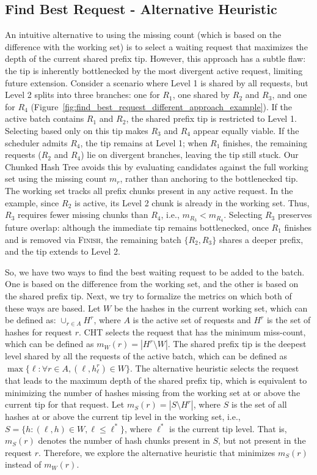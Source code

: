 \subsection{Find Best Request - Alternative Heuristic}
\label{subsec:find_best_reques_alternative_heuristic}
An intuitive alternative to using the missing count (which is based on the difference with the working set) is to select a waiting request that maximizes the depth of the current shared prefix tip. However, this approach has a subtle flaw: the tip is inherently bottlenecked by the most divergent active request, limiting future extension. Consider a scenario where Level 1 is shared by all requests, but Level 2 splits into three branches: one for $R_1$, one shared by $R_2$ and $R_3$, and one for $R_4$ (Figure~\ref{fig:find_best_request_different_approach_example}). If the active batch contains $R_1$ and $R_2$, the shared prefix tip is restricted to Level 1. Selecting based only on this tip makes $R_3$ and $R_4$ appear equally viable. If the scheduler admits $R_4$, the tip remains at Level 1; when $R_1$ finishes, the remaining requests ($R_2$ and $R_4$) lie on divergent branches, leaving the tip still stuck. Our Chunked Hash Tree avoids this by evaluating candidates against the full working set using the missing count $m_r$, rather than anchoring to the bottlenecked tip. The working set tracks all prefix chunks present in any active request. In the example, since $R_2$ is active, its Level 2 chunk is already in the working set. Thus, $R_3$ requires fewer missing chunks than $R_4$, i.e., $m_{R_3} < m_{R_4}$. Selecting $R_3$ preserves future overlap: although the immediate tip remains bottlenecked, once $R_1$ finishes and is removed via \textsc{Finish}, the remaining batch $\{R_2, R_3\}$ shares a deeper prefix, and the tip extends to Level 2. 

So, we have two ways to find the best waiting request to be added to the batch. One is based on the difference from the working set, and the other is based on the shared prefix tip. Next, we try to formalize the metrics on which both of these ways are based. Let $W$ be the hashes in the current working set, which can be defined as: $\cup_{r \in A}H^r$, where $A$ is the active set of requests and $H^r$ is the set of hashes for request $r$. CHT selects the request that has the minimum miss-count, which can be defined as $m_W(r) = |H^r \setminus W|$. The shared prefix tip is the deepest level shared by all the requests of the active batch, which can be defined as $\max\{\ell : \forall r \in A, (\ell, h_\ell^r) \in W\}$. The alternative heuristic selects the request that leads to the maximum depth of the shared prefix tip, which is equivalent to minimizing the number of hashes missing from the working set at or above the current tip for that request. Let $m_S(r) = |S \setminus H^r|$, where $S$ is the set of all hashes at or above the current tip level in the working set, i.e., $S = \{h : (\ell, h) \in W, \ell \leq \ell^*\}$, where $\ell^*$ is the current tip level. That is, $m_S(r)$ denotes the number of hash chunks present in $S$, but not present in the request $r$. Therefore, we explore the alternative heuristic that minimizes $m_S(r)$ instead of $m_W(r)$.

